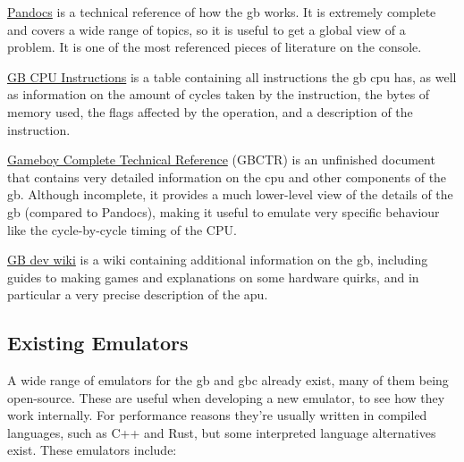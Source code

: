 \documentclass[11pt]{report}
\begin{document}
\begin{compactitem}
    \item \href{https://gbdev.io/pandocs/}{Pandocs} is a technical reference of how the \gls{gb} works. It is extremely complete and covers a wide range of topics, so it is useful to get a global view of a problem. It is one of the most referenced pieces of literature on the console.
    \item \href{https://meganesu.github.io/generate-gb-opcodes/}{GB CPU Instructions} is a table containing all instructions the \gls{gb} \gls{cpu} has, as well as information on the amount of cycles taken by the instruction, the bytes of memory used, the flags affected by the operation, and a description of the instruction.
    \item \href{https://gekkio.fi/files/gb-docs/gbctr.pdf}{Gameboy Complete Technical Reference} (GBCTR) is an unfinished document that contains very detailed information on the \gls{cpu} and other components of the \gls{gb}. Although incomplete, it provides a much lower-level view of the details of the \gls{gb} (compared to Pandocs), making it useful to emulate very specific behaviour like the cycle-by-cycle timing of the CPU.
    \item \href{https://gbdev.gg8.se/wiki/}{GB dev wiki} is a wiki containing additional information on the \gls{gb}, including guides to making games and explanations on some hardware quirks, and in particular a very precise description of the \gls{apu}.
\end{compactitem}

\subsection{Existing Emulators}

A wide range of emulators for the \gls{gb} and \gls{gbc} already exist, many of them being open-source. These are useful when developing a new emulator, to see how they work internally. For performance reasons they're usually written in compiled languages, such as C++ and Rust, but some interpreted language alternatives exist. These emulators include:
\end{document}
